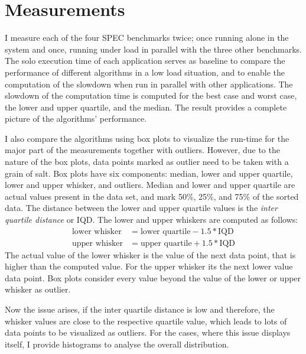 \section{Measurements}
\label{eval:measurements}

I measure each of the four SPEC benchmarks twice; once running alone in the
system and once, running under load in parallel with the three other benchmarks.
The solo execution time of each application serves as baseline to compare the
performance of different algorithms in a low load situation, and to enable the
computation of the slowdown when run in parallel with other applications.
The slowdown of the computation time is computed for the best case and worst
case, the lower and upper quartile, and the median.
The result provides a complete picture of the algorithms' performance.

I also compare the algorithms using box plots to visualize
the run-time for the major part of the measurements together with outliers.
However, due to the nature of the box plots, data points marked as outlier need
to be taken with a grain of salt.
Box plots have six components: median, lower and upper quartile, lower and
upper whisker, and outliers.
Median and lower and upper quartile are actual values present in the data set,
and mark 50\%, 25\%, and 75\% of the sorted data.
The distance between the lower and upper quartile values is the \emph{inter
quartile distance} or IQD.
The lower and upper whiskers are computed as follows:
%
\begin{align*}
  \text{lower whisker} &= \text{lower quartile} - 1.5 * \text{IQD}\\
  \text{upper whisker} &= \text{upper quartile} + 1.5 * \text{IQD}
\end{align*}
%
The actual value of the lower whisker is the value of the next data point,
that is higher than the computed value.
For the upper whisker its the next lower value data point.
Box plots consider every value beyond the value of the lower or upper whisker
as outlier.

Now the issue arises, if the inter quartile distance is low and therefore,
the whisker values are close to the respective quartile value, which leads to
lots of data points to be visualized as outliers.
For the cases, where this issue displays itself, I provide histograms to
analyse the overall distribution.


